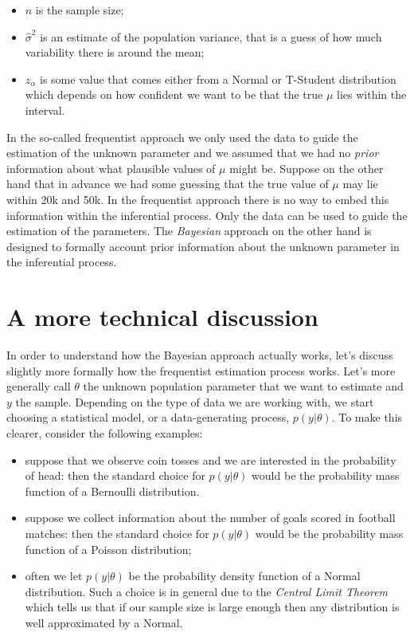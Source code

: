 \documentclass[
]{book}
\begin{document}
\begin{itemize}
\item
  \(n\) is the sample size;
\item
  \(\hat{\sigma}^2\) is an estimate of the population variance, that is a guess of how much variability there is around the mean;
\item
  \(z_{\alpha}\) is some value that comes either from a Normal or T-Student distribution which depends on how confident we want to be that the true \(\mu\) lies within the interval.
\end{itemize}

In the so-called frequentist approach we only used the data to guide the estimation of the unknown parameter and we assumed that we had no \emph{prior} information about what plausible values of \(\mu\) might be. Suppose on the other hand that in advance we had some guessing that the true value of \(\mu\) may lie within 20k and 50k. In the frequentist approach there is no way to embed this information within the inferential process. Only the data can be used to guide the estimation of the parameters. The \emph{Bayesian} approach on the other hand is designed to formally account prior information about the unknown parameter in the inferential process.

\hypertarget{a-more-technical-discussion}{%
\section{A more technical discussion}\label{a-more-technical-discussion}}

In order to understand how the Bayesian approach actually works, let's discuss slightly more formally how the frequentist estimation process works. Let's more generally call \(\theta\) the unknown population parameter that we want to estimate and \(y\) the sample. Depending on the type of data we are working with, we start choosing a statistical model, or a data-generating process, \(p(y|\theta)\). To make this clearer, consider the following examples:

\begin{itemize}
\item
  suppose that we observe coin tosses and we are interested in the probability of head: then the standard choice for \(p(y|\theta)\) would be the probability mass function of a Bernoulli distribution.
\item
  suppose we collect information about the number of goals scored in football matches: then the standard choice for \(p(y|\theta)\) would be the probability mass function of a Poisson distribution;
\item
  often we let \(p(y|\theta)\) be the probability density function of a Normal distribution. Such a choice is in general due to the \emph{Central Limit Theorem} which tells us that if our sample size is large enough then any distribution is well approximated by a Normal.
\end{itemize}
\end{document}
